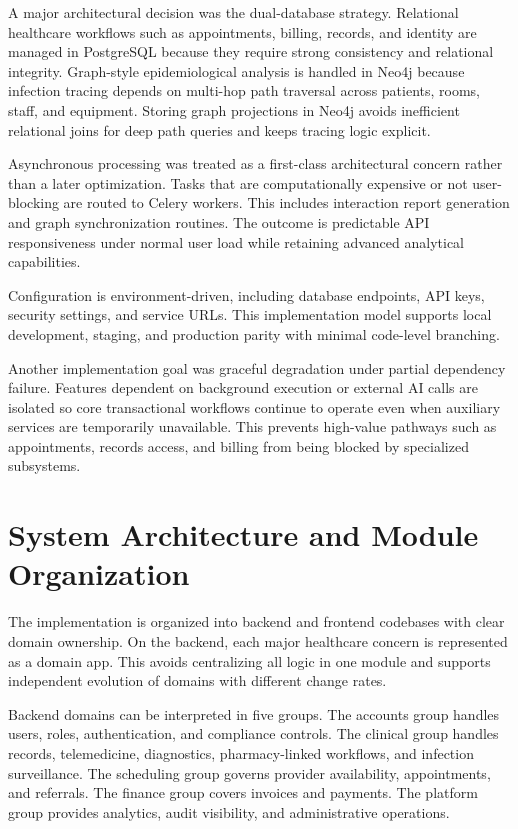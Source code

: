 A major architectural decision was the dual-database strategy. Relational healthcare workflows such as appointments, billing, records, and identity are managed in PostgreSQL because they require strong consistency and relational integrity. Graph-style epidemiological analysis is handled in Neo4j because infection tracing depends on multi-hop path traversal across patients, rooms, staff, and equipment. Storing graph projections in Neo4j avoids inefficient relational joins for deep path queries and keeps tracing logic explicit.

Asynchronous processing was treated as a first-class architectural concern rather than a later optimization. Tasks that are computationally expensive or not user-blocking are routed to Celery workers. This includes interaction report generation and graph synchronization routines. The outcome is predictable API responsiveness under normal user load while retaining advanced analytical capabilities.

Configuration is environment-driven, including database endpoints, API keys, security settings, and service URLs. This implementation model supports local development, staging, and production parity with minimal code-level branching.

Another implementation goal was graceful degradation under partial dependency failure. Features dependent on background execution or external AI calls are isolated so core transactional workflows continue to operate even when auxiliary services are temporarily unavailable. This prevents high-value pathways such as appointments, records access, and billing from being blocked by specialized subsystems.

\section{System Architecture and Module Organization}\label{52-system-architecture-and-module-organization}

The implementation is organized into backend and frontend codebases with clear domain ownership. On the backend, each major healthcare concern is represented as a domain app. This avoids centralizing all logic in one module and supports independent evolution of domains with different change rates.

Backend domains can be interpreted in five groups. The accounts group handles users, roles, authentication, and compliance controls. The clinical group handles records, telemedicine, diagnostics, pharmacy-linked workflows, and infection surveillance. The scheduling group governs provider availability, appointments, and referrals. The finance group covers invoices and payments. The platform group provides analytics, audit visibility, and administrative operations.

